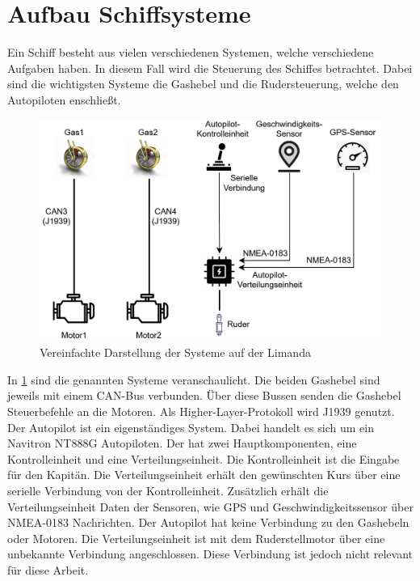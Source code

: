 \section{Aufbau Schiffsysteme}
Ein Schiff besteht aus vielen verschiedenen Systemen, welche verschiedene Aufgaben haben. In diesem Fall wird die
Steuerung des Schiffes betrachtet. Dabei sind die wichtigsten Systeme die Gashebel und die Rudersteuerung, welche den Autopiloten enschließt.
\begin{figure}[H]
    \centering
    \includegraphics[scale=0.5]{images/limandaSystem.png}
    \caption{Vereinfachte Darstellung der Systeme auf der Limanda}
    \label{fig:limandaSystem}
\end{figure}
In \ref{fig:limandaSystem} sind die genannten Systeme veranschaulicht. Die beiden Gashebel sind jeweils
mit einem CAN-Bus verbunden. Über diese Bussen senden die Gashebel Steuerbefehle an die Motoren. Als Higher-Layer-Protokoll wird 
J1939 genutzt. \\
Der Autopilot ist ein eigenständiges System. Dabei handelt es sich um ein Navitron NT888G Autopiloten. Der hat zwei Hauptkomponenten,
eine Kontrolleinheit und eine Verteilungseinheit. Die Kontrolleinheit ist die Eingabe für den Kapitän. Die 
Verteilungseinheit erhält den gewünschten Kurs über eine serielle Verbindung von der Kontrolleinheit. Zusätzlich erhält die 
Verteilungseinheit Daten der Sensoren, wie GPS und Geschwindigkeitssensor über NMEA-0183 Nachrichten. 
Der Autopilot hat keine Verbindung zu den Gashebeln oder Motoren. Die Verteilungseinheit ist mit dem Ruderstellmotor über 
eine unbekannte Verbindung angeschlossen. Diese Verbindung ist
jedoch nicht relevant für diese Arbeit. 

